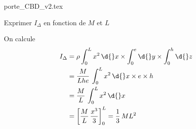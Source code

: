                                 \initialisationPartieDroite %
\begin{center}
{porte_CBD_v2.tex}
\end{center}
                               \finalisationDuPartageDePage %



\debutEntrainement


\bigskip

\begin{enonce}
Exprimer $I_\Delta$ en fonction de $M$ et $L$
\end{enonce}



\begin{corrige}
On calcule 
\begin{align*}
I_\Delta 
	&= \rho\int_{0}^{L} x^2\,\d{}x \times \int_{0}^{e}\d{}y \times \int_{0}^{h}\d{}z	\\
	&= \frac{M}{Lhe}\,\int_{0}^{L} x^2\,\d{}x \times e \times h\\
	&= \frac{M}{L}\,\int_{0}^{L} x^2\,\d{}x\\
    &= \left[\frac{M}{L}\,\frac{x^3}{3}\right]_{0}^{L}
    = \frac1{3}\,ML^2
\end{align*}
\end{corrige}


\finEntrainement



\newpage



